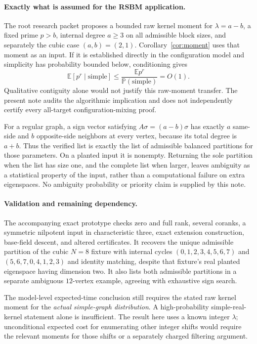 \documentclass[11pt]{article}
\newcommand{\E}{\mathbb E}
\newcommand{\Prob}{\mathbb P}
\begin{document}
\paragraph{Exactly what is assumed for the RSBM application.}
The root research packet proposes a bounded raw kernel moment for
$\lambda=a-b$, a fixed prime $p>b$, internal degree $a\ge3$ on
all admissible block sizes, and separately the cubic case $(a,b)=(2,1)$.
Corollary~\ref{cor:moment} uses that moment as an input.
If it is established directly in the configuration model and
simplicity has probability bounded below, conditioning gives
\[
 \E[p^r\mid\mathrm{simple}]
 \le\frac{\E p^r}{\Prob(\mathrm{simple})}=O(1).
\]
Qualitative contiguity alone would not justify this raw-moment transfer.
The present note audits the algorithmic implication and does not
independently certify every all-target configuration-mixing proof.

For a regular graph, a sign vector satisfying
$A\sigma=(a-b)\sigma$ has exactly $a$ same-side and $b$ opposite-side
neighbors at every vertex, because its total degree is $a+b$.
Thus the verified list is exactly the list of admissible balanced
partitions for those parameters. On a planted input it is nonempty.
Returning the sole partition when the list has size one, and the
complete list when larger, leaves ambiguity as a statistical property
of the input, rather than a computational failure on extra eigenspaces.
No ambiguity probability or priority claim is supplied by this note.

\paragraph{Validation and remaining dependency.}
The accompanying exact prototype checks zero and full rank, several
coranks, a symmetric nilpotent input in characteristic three, exact
extension construction, base-field descent, and altered certificates.
It recovers the unique admissible partition of the cubic $N=8$
fixture with internal cycles $(0,1,2,3,4,5,6,7)$ and
$(5,6,7,0,4,1,2,3)$ and identity matching, despite that fixture's
real planted eigenspace having dimension two.
It also lists both admissible partitions in a separate ambiguous
$12$-vertex example, agreeing with exhaustive sign search.

The model-level expected-time conclusion still requires the stated
raw kernel moment for the \emph{actual simple-graph distribution}.
A high-probability simple-real-kernel statement alone is insufficient.
The result here uses a known integer $\lambda$; unconditional expected
cost for enumerating other integer shifts would require the relevant
moments for those shifts or a separately charged filtering argument.
\end{document}
